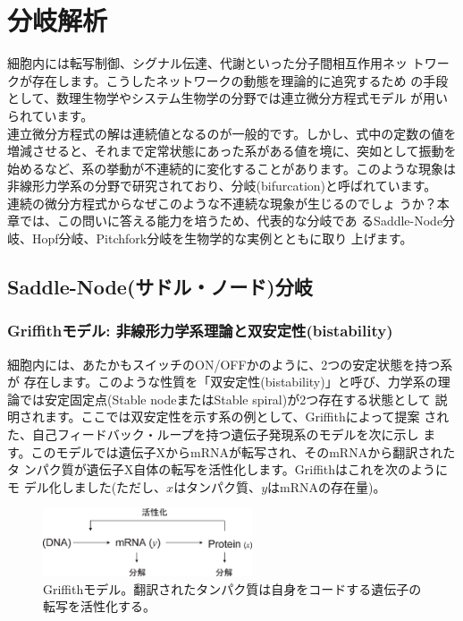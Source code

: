 \chapter{分岐解析}
\indent 細胞内には転写制御、シグナル伝達、代謝といった分子間相互作用ネッ
トワークが存在します。こうしたネットワークの動態を理論的に追究するため
の手段として、数理生物学やシステム生物学の分野では連立微分方程式モデル
が用いられています。\\
\indent 連立微分方程式の解は連続値となるのが一般的です。しかし、式中の定数の値を増減させると、それまで定常状態にあった系がある値を境に、突如として振動を始めるなど、系の挙動が不連続的に変化することがあります。このような現象は非線形力学系の分野で研究されており、分岐(bifurcation)と呼ばれています。\\
\indent 連続の微分方程式からなぜこのような不連続な現象が生じるのでしょ
うか？本章では、この問いに答える能力を培うため、代表的な分岐であ
るSaddle-Node分岐、Hopf分岐、Pitchfork分岐を生物学的な実例とともに取り
上げます。

\section{Saddle-Node(サドル・ノード)分岐}
\subsection{Griffithモデル: 非線形力学系理論と双安定性(bistability)}
細胞内には、あたかもスイッチのON/OFFかのように、2つの安定状態を持つ系が
存在します。このような性質を「双安定性(bistability)」と呼び、力学系の理
論では安定固定点(Stable nodeまたはStable spiral)が2つ存在する状態として
説明されます。ここでは双安定性を示す系の例として、Griffithによって提案
された、自己フィードバック・ループを持つ遺伝子発現系のモデルを次に示し
ます。このモデルでは遺伝子XからmRNAが転写され、そのmRNAから翻訳されたタ
ンパク質が遺伝子X自体の転写を活性化します。Griffithはこれを次のようにモ
デル化しました(ただし、\(x\)はタンパク質、\(y\)はmRNAの存在量)。

\begin{figure}[ht]
        \centering \includegraphics[height=2cm]{../Bifurcation/img/griffith_model.eps}
        \caption{Griffithモデル。翻訳されたタンパク質は自身をコードする遺伝子の転写を活性化する。}
        \label{fig:04sysbio} \end{figure}

